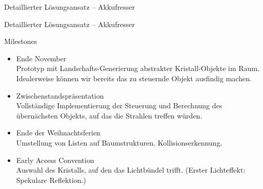 \begin{frame}
{Detaillierter Lösungsansatz -- Akkufresser}
	
\end{frame}
\begin{frame}
{Detaillierter Lösungsansatz -- Akkufresser}
	
\end{frame}




\begin{frame}{Milestones}
	\begin{itemize}
		
		

		\item \textcolor{evap@lightgreen}{Ende November\\
			Prototyp mit Landschafts-Generierung abstrakter \glqq Kristall\grqq -Objekte im Raum. Idealerweise können wir bereits das zu steuernde Objekt ausfindig machen.}
			
		\item \textcolor{evap@yellow}{Zwischenstandspräsentation\\
			Vollständige Implementierung der Steuerung und Berechnung des übernächsten Objekts, auf das die Strahlen treffen würden.}
			
		\item Ende der Weihnachtsferien\\
			Umstellung von Listen auf Baumstrukturen. Kollisionserkennung.
		\item Early Access Convention\\
			Auswahl des Kristalls, auf den das Lichtbündel trifft. (Erster Lichteffekt: Spekulare Reflektion.)
	\end{itemize}
\end{frame}

%

